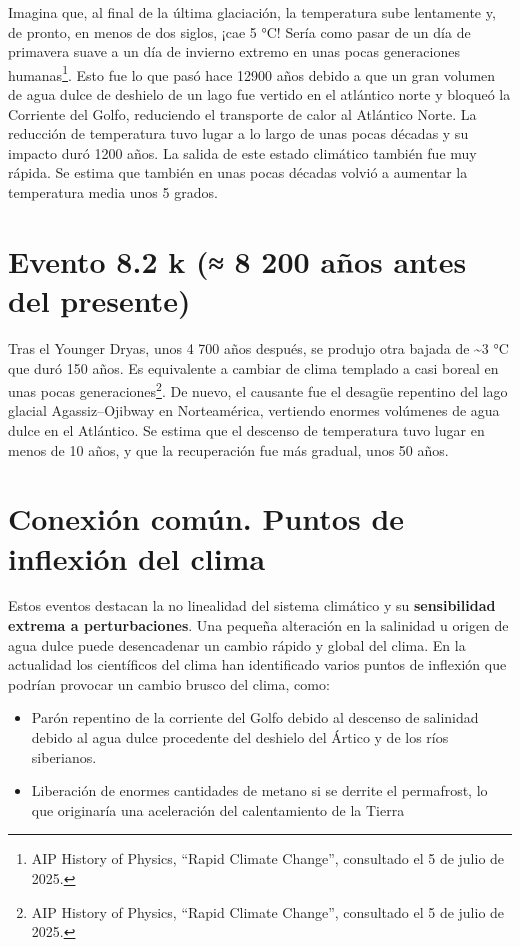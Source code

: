 \documentclass[
  10pt,
  a4paper,
  DIV=11,
  numbers=noendperiod,
  open=any]{scrreprt}
\providecommand{\tightlist}{%
  \setlength{\itemsep}{0pt}\setlength{\parskip}{0pt}}
\numberwithin{equation}{chapter}
\numberwithin{equation}{section}
\renewcommand{\[}{\begin{equation}}
\renewcommand{\]}{\end{equation}}
\begin{document}
Imagina que, al final de la última glaciación, la temperatura sube
lentamente y, de pronto, en menos de dos siglos, ¡cae 5 °C! Sería como
pasar de un día de primavera suave a un día de invierno extremo en unas
pocas generaciones humanas\footnote{AIP History of Physics, ``Rapid
  Climate Change'', consultado el 5 de julio de 2025.}. Esto fue lo que
pasó hace 12900 años debido a que un gran volumen de agua dulce de
deshielo de un lago fue vertido en el atlántico norte y bloqueó la
Corriente del Golfo, reduciendo el transporte de calor al Atlántico
Norte. La reducción de temperatura tuvo lugar a lo largo de unas pocas
décadas y su impacto duró 1200 años. La salida de este estado climático
también fue muy rápida. Se estima que también en unas pocas décadas
volvió a aumentar la temperatura media unos 5 grados.

\section{Evento 8.2 k (≈ 8 200 años antes del
presente)}\label{evento-8.2-k-8-200-auxf1os-antes-del-presente}

Tras el Younger Dryas, unos 4 700 años después, se produjo otra bajada
de \textasciitilde3 °C que duró 150 años. Es equivalente a cambiar de
clima templado a casi boreal en unas pocas generaciones\footnote{AIP
  History of Physics, ``Rapid Climate Change'', consultado el 5 de julio
  de 2025.}. De nuevo, el causante fue el desagüe repentino del lago
glacial Agassiz--Ojibway en Norteamérica, vertiendo enormes volúmenes de
agua dulce en el Atlántico. Se estima que el descenso de temperatura
tuvo lugar en menos de 10 años, y que la recuperación fue más gradual,
unos 50 años.

\section{Conexión común. Puntos de inflexión del
clima}\label{conexiuxf3n-comuxfan.-puntos-de-inflexiuxf3n-del-clima}

Estos eventos destacan la no linealidad del sistema climático y su
\textbf{sensibilidad extrema a perturbaciones}. Una pequeña alteración
en la salinidad u origen de agua dulce puede desencadenar un cambio
rápido y global del clima. En la actualidad los científicos del clima
han identificado varios puntos de inflexión que podrían provocar un
cambio brusco del clima, como:

\begin{itemize}
\tightlist
\item
  Parón repentino de la corriente del Golfo debido al descenso de
  salinidad debido al agua dulce procedente del deshielo del Ártico y de
  los ríos siberianos.
\item
  Liberación de enormes cantidades de metano si se derrite el
  permafrost, lo que originaría una aceleración del calentamiento de la
  Tierra
\end{itemize}
\end{document}
